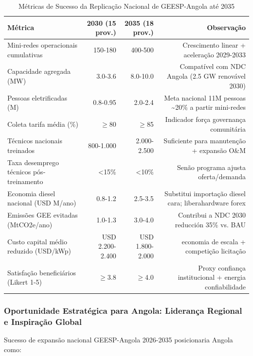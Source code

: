 \documentclass[12pt, a4paper]{article}
\begin{document}
\begin{table}[H]
\centering
\caption{Métricas de Sucesso da Replicação Nacional de GEESP-Angola até 2035}
\label{tab:national_replication_metrics}
\small
\begin{tabular}{lrrr}
\toprule
\rowcolor{LightBlue}\textbf{Métrica} & \textbf{2030 (15 prov.)} & \textbf{2035 (18 prov.)} & \textbf{Observação} \\
\midrule
Mini-redes operacionais cumulativas & 150-180 & 400-500 & Crescimento linear + aceleração 2029-2033 \\
\midrule
Capacidade agregada (MW) & 3.0-3.6 & 8.0-10.0 & Compatível com NDC Angola (2.5 GW renovável 2030) \\
\midrule
Pessoas eletrificadas (M) & 0.8-0.95 & 2.0-2.4 & Meta nacional 11M pessoas \textasciitilde{}20\% a partir mini-redes \\
\midrule
Coleta tarifa média (\%) & $\geq$80 & $\geq$85 & Indicador força governança comunitária \\
\midrule
Técnicos nacionais treinados & 800-1.000 & 2.000-2.500 & Suficiente para manutenção + expansão O\&M \\
\midrule
Taxa desemprego técnicos pós-treinamento & <15\% & <10\% & Senão programa ajusta oferta/demanda \\
\midrule
Economia diesel nacional (USD M/ano) & 0.8-1.2 & 2.5-3.5 & Substitui importação diesel cara; liberahardware forex \\
\midrule
Emissões GEE evitadas (MtCO2e/ano) & 1.0-1.3 & 3.0-4.0 & Contribui a NDC 2030 reducción 35\% vs. BAU \\
\midrule
Custo capital médio reduzido (USD/kWp) & USD 2.200-2.400 & USD 1.800-2.000 & economia de escala + competição licitação \\
\midrule
Satisfação beneficiários (Likert 1-5) & $\geq$3.8 & $\geq$4.0 & Proxy confiança institucional + energia confiabilidade \\
\bottomrule
\end{tabular}
\end{table}

\subsubsection{Oportunidade Estratégica para Angola: Liderança Regional e Inspiração Global}

Sucesso de expansão nacional GEESP-Angola 2026-2035 posicionaria Angola como:
\end{document}
